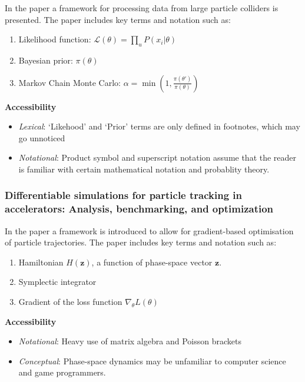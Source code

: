In the paper  a framework for processing data from large particle colliders is presented.
The paper includes key terms and notation such as:
\begin{enumerate}
    \item Likelihood function: $\mathcal{L}(\theta)=\prod_u P(x_i|\theta)$
    \item Bayesian prior: $\pi(\theta)$
    \item Markov Chain Monte Carlo: $\alpha=\min\!\left(1,\frac{\pi(\theta')}{\pi(\theta)}\right)$
\end{enumerate}

\textbf{Accessibility}

\begin{itemize}
    \item \emph{Lexical}: `Likehood' and `Prior' terms are only defined in footnotes, which may go unnoticed
    \item \emph{Notational}: Product symbol and superscript notation assume that the reader is familiar with certain mathematical notation and probablity theory.
\end{itemize}

\subsubsection*{Differentiable simulations for particle tracking in accelerators: Analysis, benchmarking, and optimization}

In the paper  a framework is introduced to allow for gradient-based optimisation of particle trajectories.
The paper includes key terms and notation such as:

\begin{enumerate}
    \item Hamiltonian $H(\mathbf{z})$, a function of phase-space vector $\mathbf{z}$.
    \item Symplectic integrator
    \item Gradient of the loss function $\nabla_{\theta}L(\theta)$
\end{enumerate}

\textbf{Accessibility}

\begin{itemize}
    \item \emph{Notational}: Heavy use of matrix algebra and Poisson brackets
    \item \emph{Conceptual}: Phase-space dynamics may be unfamiliar to computer science and game programmers.
\end{itemize}

